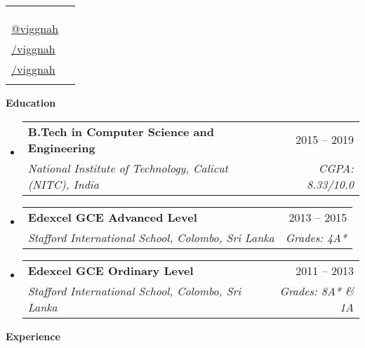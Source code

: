 \documentclass[letterpaper,12pt]{article}[leftmargin=*]
\makeatletter
\def \fullname {Viggnah Selvaraj}
\def \subtitle {}
\def \linkedinicon {\faLinkedin}
\def \linkedinlink {https://linkedin.com/in/viggnah/}
\def \linkedintext {/viggnah}
\def \phoneicon {\faPhoneSquare}
\def \phonetext {+94 77 109 4041}
\def \addressicon {\faHome}
\def \addresstext {224/1, Pickerings Rd, Colombo 13}
\def \nicicon {\faCreditCard}
\def \nictext {972594580V}
\def \emailicon {\faEnvelope}
\def \emaillink {mailto:viggnahselvaraj@hotmail.com}
\def \emailtext {viggnahselvaraj@hotmail.com}
\def \githubicon {\faGithub}
\def \githublink {https://github.com/viggnah}
\def \githubtext {/viggnah}
\def \websiteicon {\faMedium}
\def \websitelink {https://medium.com/@viggnah}
\def \websitetext {@viggnah}
\def \headertype {\singlecol} %
\def \entryspacing {-0pt}
\def \linkedin {\linkedinicon \hspace{3pt}\href{\linkedinlink}{\linkedintext}}
\def \phone {\phoneicon \hspace{3pt}{ \phonetext}}
\def \address {\addressicon \hspace{3pt}{ \addresstext}}
\def \nic {\nicicon \hspace{3pt}{ \nictext}}
\def \email {\emailicon \hspace{3pt}\href{\emaillink}{\emailtext}}
\def \github {\githubicon \hspace{3pt}\href{\githublink}{\githubtext}}
\def \website {\websiteicon \hspace{3pt}\href{\websitelink}{\websitetext}}
\renewcommand{\section}[2]{\vspace{5pt}
  \colorbox{secondary}{\color{white}\raggedbottom\normalsize\textbf{{#1}{\hspace{7pt}#2}}}
}
\newcommand{\resumeEntryStart}{\begin{itemize}[leftmargin=2.5mm]}
\newcommand{\resumeEntryEnd}{\end{itemize}\vspace{\entryspacing}}
\newcommand{\resumeEntryTSDL}[4]{
  \vspace{-1pt}\item[]
    \begin{tabularx}{0.97\textwidth}{X@{\hspace{60pt}}r}
      \textbf{\color{primary}#1} & {\firabook\color{accent}\small#2} \\
      \textit{\color{accent}\small#3} & \textit{\color{accent}\small#4} \\
    \end{tabularx}\vspace{-6pt}
}
\newcommand{\resumeEntryS}[2]{
  \item[]\small{
    \textbf{\color{primary}#1 }{ #2 \vspace{-6pt}}
  }
}
\newcommand{\doublecol}[6]{
  \begin{tabularx}{\textwidth}{Xr}
    {
      \begin{tabular}[c]{l}
        \fontsize{35}{45}\selectfont{\color{primary}{{\textbf{\fullname}}}} \\
        {\textit{\subtitle}} %
      \end{tabular}
    } & {
      \begin{tabular}[c]{l@{\hspace{1.5em}}l}
        {\small#4} & {\small#1} \\
        {\small#5} & {\small#2} \\
        {\small#6} & {\small#3}
      \end{tabular}
    }
  \end{tabularx}
}
\newcommand{\singlecol}[6]{
  \begin{tabularx}{\textwidth}{Xr}
    {
      \begin{tabular}[b]{l}
        \fontsize{35}{45}\selectfont{\color{primary}{{\textbf{\fullname}}}} \\
        {\textit{\subtitle}} %
      \end{tabular}
    } & {
      \begin{tabular}[c]{l}
        {\small#1} \\
        {\small#2} \\
        {\small#3} \\
        {\small#4} \\
        {\small#5} \\
        {\small#6}
      \end{tabular}
    }
  \end{tabularx}
}
\makeatother
\begin{document}


\headertype{\email}{\phone}{\website}{\github}{\linkedin}{} %
\vspace{-35pt} %



\section{\faGraduationCap}{Education}

  \resumeEntryStart
    \resumeEntryTSDL
      {B.Tech in Computer Science and Engineering}{2015 -- 2019}
      {National Institute of Technology, Calicut (NITC), India}{CGPA: 8.33/10.0}
  \resumeEntryEnd 

  \resumeEntryStart     
    \resumeEntryTSDL
      {Edexcel GCE Advanced Level}{2013 -- 2015}
      {Stafford International School, Colombo, Sri Lanka}{Grades: 4A*}
  \resumeEntryEnd

  \resumeEntryStart     
    \resumeEntryTSDL
      {Edexcel GCE Ordinary Level}{2011 -- 2013}
      {Stafford International School, Colombo, Sri Lanka}{Grades: 8A* \& 1A}
  \resumeEntryEnd
  
\section{\faIndustry}{Experience}
\end{document}
